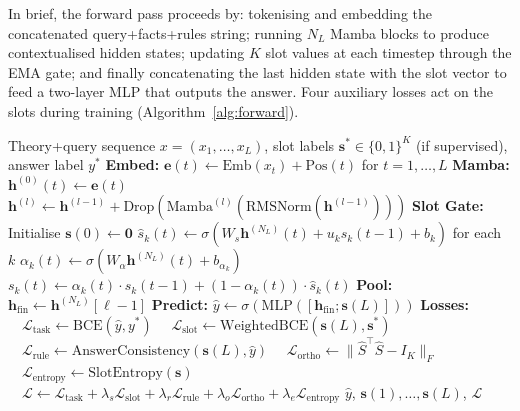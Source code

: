 \documentclass[conference]{IEEEtran}
\DeclareRobustCommand{\model}{NeSy-Mamba}
\begin{document}
In brief, the forward pass proceeds by: tokenising and embedding
the concatenated query+facts+rules string; running $N_L$ Mamba
blocks to produce contextualised hidden states; updating $K$ slot
values at each timestep through the EMA gate; and finally
concatenating the last hidden state with the slot vector to feed
a two-layer MLP that outputs the answer. Four auxiliary losses
act on the slots during training (Algorithm~\ref{alg:forward}).

\begin{algorithm}[t]
\caption{\model{} Forward Pass and Loss Computation}
\label{alg:forward}
\begin{algorithmic}[1]
\REQUIRE Theory+query sequence $x = (x_1, \ldots, x_L)$,
  slot labels $\mathbf{s}^* \in \{0,1\}^K$ (if supervised),
  answer label $y^*$
\STATE \textbf{Embed:} $\mathbf{e}(t) \leftarrow \mathrm{Emb}(x_t) + \mathrm{Pos}(t)$
        for $t = 1, \ldots, L$
\STATE \textbf{Mamba:} $\mathbf{h}^{(0)}(t) \leftarrow \mathbf{e}(t)$
    \STATE $\mathbf{h}^{(l)} \!\leftarrow\! \mathbf{h}^{(l-1)} \!+\!
        \mathrm{Drop}(\mathrm{Mamba}^{(l)}(\mathrm{RMSNorm}(\mathbf{h}^{(l-1)})))$
\ENDFOR
\STATE \textbf{Slot Gate:} Initialise $\mathbf{s}(0) \leftarrow \mathbf{0}$
    \STATE $\hat{s}_k(t) \leftarrow \sigma(W_s \mathbf{h}^{(N_L)}(t) + u_k s_k(t{-}1) + b_k)$ for each $k$
    \STATE $\alpha_k(t) \leftarrow \sigma(W_\alpha \mathbf{h}^{(N_L)}(t) + b_{\alpha_k})$
    \STATE $s_k(t) \leftarrow \alpha_k(t) \cdot s_k(t{-}1) + (1-\alpha_k(t)) \cdot \hat{s}_k(t)$
\ENDFOR
\STATE \textbf{Pool:} $\mathbf{h}_{\mathrm{fin}} \leftarrow \mathbf{h}^{(N_L)}[\ell-1]$ 
\STATE \textbf{Predict:} $\hat{y} \leftarrow \sigma(\mathrm{MLP}([\mathbf{h}_{\mathrm{fin}}; \mathbf{s}(L)]))$
\STATE \textbf{Losses:}
\STATE $\quad \mathcal{L}_{\text{task}} \leftarrow \mathrm{BCE}(\hat{y}, y^*)$
\STATE $\quad \mathcal{L}_{\text{slot}} \leftarrow \text{WeightedBCE}(\mathbf{s}(L), \mathbf{s}^*)$
\STATE $\quad \mathcal{L}_{\text{rule}} \leftarrow \text{AnswerConsistency}(\mathbf{s}(L), \hat{y})$
\STATE $\quad \mathcal{L}_{\text{ortho}} \leftarrow \|{\hat{S}^\top \hat{S} - I_K}\|_F$
\STATE $\quad \mathcal{L}_{\text{entropy}} \leftarrow \text{SlotEntropy}(\mathbf{s})$
\STATE $\quad \mathcal{L} \leftarrow \mathcal{L}_{\text{task}} + \lambda_s \mathcal{L}_{\text{slot}} + \lambda_r \mathcal{L}_{\text{rule}} + \lambda_o \mathcal{L}_{\text{ortho}} + \lambda_e \mathcal{L}_{\text{entropy}}$
\RETURN $\hat{y}$, $\mathbf{s}(1), \ldots, \mathbf{s}(L)$, $\mathcal{L}$
\end{algorithmic}
\end{algorithm}
\end{document}
